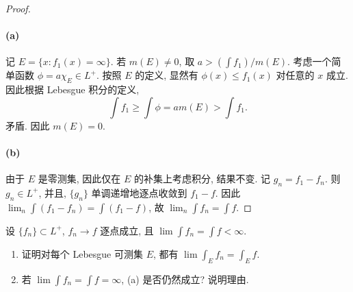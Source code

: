 \documentclass{article}
\begin{document}
\begin{proof}
	\paragraph{(a)} 记 $E = \{x: f_1(x) = \infty\}$. 若 $m(E) \neq 0$, 取 $a > (\int f_1)/m(E)$. 考虑一个简单函数 $\phi = a \chi_E \in L^+$. 按照 $E$ 的定义, 显然有 $\phi(x) \le f_1(x)$ 对任意的 $x$ 成立. 因此根据 Lebesgue 积分的定义, 
	\[ \int f_1 \ge \int \phi = a m(E) > \int f_1. \]
	矛盾. 因此 $m(E) = 0$.

	\paragraph{(b)} 由于 $E$ 是零测集, 因此仅在 $E$ 的补集上考虑积分, 结果不变. 记 $g_n = f_1 - f_n$. 则 $g_n \in L^+$, 并且, $\{g_n\}$ 单调递增地逐点收敛到 $f_1 - f$. 因此 $\lim_{n} \int (f_1 - f_n) = \int (f_1 - f)$, 故 $\lim_{n} \int f_n = \int f$. 
\end{proof}



\begin{problem}
  设 $\{f_n\}\subset L^+$, $f_n\to f$ 逐点成立, 且 $\lim\int f_n=\int f<\infty$.
  \begin{enumerate}
    \item[(a)] 证明对每个 Lebesgue 可测集 $E$, 都有 $\lim\int_E f_n=\int_E f$.
    \item[(b)] 若 $\lim\int f_n=\int f=\infty$, (a) 是否仍然成立? 说明理由.
  \end{enumerate}
\end{problem}
\end{document}
